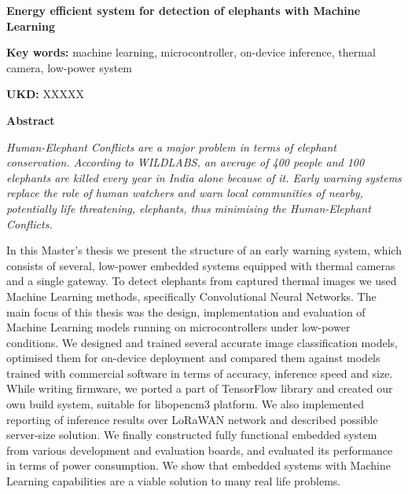 \begin{poglavje}
\noindent\bfseries Energy efficient system for detection of elephants with Machine Learning
\end{poglavje}

\bigskip
\bigskip
\bigskip
\bigskip
\bigskip
\textbf{Key words:} machine learning, microcontroller, on-device inference, thermal camera, low-power system

\bigskip
\textbf{UKD:} XXXXX

\bigskip
\bigskip
\bigskip
\bigskip
\textbf{Abstract}

{\itshape
Human-Elephant Conflicts are a major problem in terms of elephant conservation.
According to WILDLABS, an average of 400 people and 100 elephants are killed every year in India alone because of it. 
Early warning systems replace the role of human watchers and warn local communities of nearby, potentially life threatening, elephants, thus minimising the Human-Elephant Conflicts.

In this Master's thesis we present the structure of an early warning system, which consists of several, low-power embedded systems equipped with thermal cameras and a single gateway.
To detect elephants from captured thermal images we used Machine Learning methods, specifically Convolutional Neural Networks.
The main focus of this thesis was the design, implementation and evaluation of Machine Learning models running on microcontrollers under low-power conditions.
We designed and trained several accurate image classification models, optimised them for on-device deployment and compared them against models trained with commercial software in terms of accuracy, inference speed and size.
While writing firmware, we ported a part of TensorFlow library and created our own build system, suitable for libopencm3 platform. 
We also implemented reporting of inference results over LoRaWAN network and described possible server-size solution.
We finally constructed fully functional embedded system from various development and evaluation boards, and evaluated its performance in terms of power consumption.
We show that embedded systems with Machine Learning capabilities are a viable solution to many real life problems.
}
\newpage
